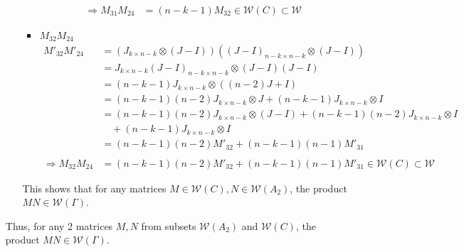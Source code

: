\documentclass{article}
\begin{document}
\begin{itemize}
\begin{itemize}
\begin{itemize}
\begin{align*}
                \Rightarrow M_{31}M_{24} &= (n-k-1)M_{32} \in \mathcal{W}(C) \subset\mathcal{W}
            \end{align*}
            \item $M_{32}M_{24}$
            \begin{align*}
                M'_{32}M'_{24}
                &= (J_{k\times n-k}\otimes (J-I))((J-I)_{n-k\times n-k} \otimes (J-I)) \\
                &= J_{k\times n-k}(J-I)_{n-k\times n-k} \otimes (J-I)(J-I) \\
                &= (n-k-1)J_{k\times n-k}\otimes ((n-2)J + I) \\
                &= (n-k-1)(n-2)J_{k\times n-k}\otimes J + (n-k-1)J_{k\times n-k}\otimes I\\
                &= (n-k-1)(n-2)J_{k\times n-k}\otimes (J-I) + (n-k-1)(n-2)J_{k\times n-k}\otimes I \\
                &\quad+ (n-k-1)J_{k\times n-k}\otimes I\\
                &= (n-k-1)(n-2)M'_{32} + (n-k-1)(n-1)M'_{31} \\\\
                \Rightarrow M_{32}M_{24} &= (n-k-1)(n-2)M'_{32} + (n-k-1)(n-1)M'_{31} \in \mathcal{W}(C) \subset\mathcal{W}
            \end{align*}
        \end{itemize}
        This shows that for any matrices $M\in\mathcal{W}(C),N \in \mathcal{W}(A_2)$, the product $MN\in\mathcal{W}(\Gamma)$.
    \end{itemize}
    Thus, for any 2 matrices $M,N$ from subsets $\mathcal{W}(A_2)$ and $\mathcal{W}(C)$, the product $MN \in \mathcal{W}(\Gamma)$.


\end{itemize}
\end{document}
